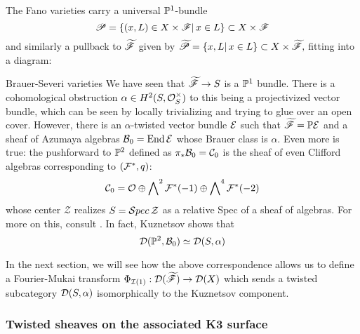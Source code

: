 The Fano varieties carry a universal $\P^1$-bundle $$\scrP = \{ (x,L)\in X\times \scrF | \, x\in L\} \subset X \times \scrF$$
and similarly a pullback to $\tscrF$ given by $\tscrP = \{ x,L | \, x\in L\} \subset X \times \tscrF,$
fitting into a diagram: 
\begin{center}
\end{center}

\begin{remark}{Brauer-Severi varieties}{}
    We have seen that $\tscrF\rightarrow S$ is a $\P^1$ bundle. There is a cohomological obstruction $\alpha \in H^2(S, \O_S^\times)$ to this being a projectivized vector bundle, which can be seen by locally trivializing and trying to glue over an open cover. However, there is an $\alpha$-twisted vector bundle $\calE$ such that $\tscrF=\P \calE$ and a sheaf of Azumaya algebras $\calB_0 = \mathrm{End}\,\calE$ whose Brauer class is $\alpha$.  Even more is true: the pushforward to $\P^2$ defined as $\pi_* \calB_0 = \calC_0$ is the sheaf of even Clifford algebras corresponding to $(\calF^*, q)$: $$\calC_0=\O \oplus \bigwedge\nolimits^2 \calF^*(-1)\oplus \bigwedge\nolimits^4\calF^*(-2)$$ whose center $\mathcal{Z}$ realizes $S=\calS pec\, \mathcal{Z}$ as a relative Spec of a sheaf of algebras. For more on this, consult \cite{auel_fibrations_2014}. In fact, Kuznetsov \cite{KuznetsovDerivedCubic} shows that $$\calD(\P^2, \calB_0)\simeq \calD(S, \alpha)$$
    
\end{remark}

In the next section, we will see how the above correspondence allows us to define a Fourier-Mukai transform $\Phi_{\calI(1)}: \calD (\tscrF)\rightarrow \calD (X)$ which sends a twisted subcategory $\calD(S,\alpha)$ isomorphically to the Kuznetsov component.

\subsubsection{Twisted sheaves on the associated K3 surface}

